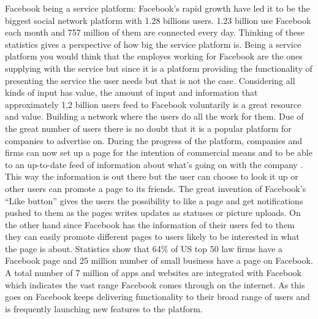 \documentclass[conference]{IEEEtran}
\begin{document}
Facebook being a service platform:
Facebook’s rapid growth have led it to be the biggest social network platform with 1.28 billions users. 1.23 billion use Facebook each month and 757 million of them are connected every day\cite{FBInfo}. Thinking of these statistics gives a perspective of how big the service platform is. Being a service platform you would think that the employes working for Facebook are the ones supplying with the service but since it is a platform providing the functionality of presenting the service the user needs but that is not the case. Considering all kinds of input has value, the amount of input and information that approximately 1,2 billion users feed to Facebook voluntarily is a great resource and value. Building a network where the users do all the work for them. Due of the great number of users there is no doubt that it is a popular platform for companies to advertise on. During the progress of the platform, companies and firms can now set up a page for the intention of commercial means and to be able to an up-to-date feed of information about what's going on with the company . This way the information is out there but the user can choose to look it up or other users can promote a page to its friends. The great invention of Facebook’s “Like button” gives the users the possibility to like a page and get notifications pushed to them as the pages writes updates as statuses or picture uploads. On the other hand since Facebook has the information of their users fed to them they can easily promote different pages to users likely to be interested in what the page is about. Statistics show that 64\% of US top 50 law firms have a Facebook page and 25 million number of small business have a page on Facebook. A total number of 7 million of apps and websites are integrated with Facebook which indicates the vast range Facebook comes through on the internet\cite{Smith2014}.  As this goes on Facebook keeps delivering functionality to their broad range of users and is frequently launching new features to the platform.
\end{document}

